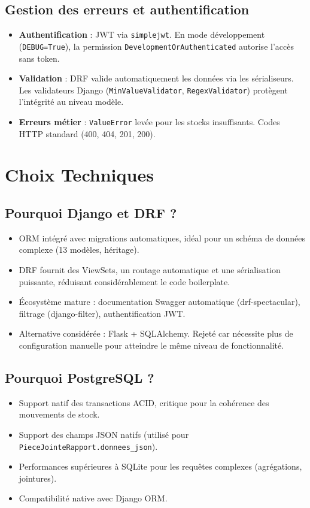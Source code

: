 \documentclass[12pt,a4paper]{report}
\begin{document}
\section{Gestion des erreurs et authentification}
\begin{itemize}
    \item \textbf{Authentification} : JWT via \texttt{simplejwt}. En mode développement (\texttt{DEBUG=True}), la permission \texttt{DevelopmentOrAuthenticated} autorise l'accès sans token.
    \item \textbf{Validation} : DRF valide automatiquement les données via les sérialiseurs. Les validateurs Django (\texttt{MinValueValidator}, \texttt{RegexValidator}) protègent l'intégrité au niveau modèle.
    \item \textbf{Erreurs métier} : \texttt{ValueError} levée pour les stocks insuffisants. Codes HTTP standard (400, 404, 201, 200).
\end{itemize}

\chapter{Choix Techniques}

\section{Pourquoi Django et DRF ?}
\begin{itemize}
    \item ORM intégré avec migrations automatiques, idéal pour un schéma de données complexe (13 modèles, héritage).
    \item DRF fournit des ViewSets, un routage automatique et une sérialisation puissante, réduisant considérablement le code boilerplate.
    \item Écosystème mature : documentation Swagger automatique (drf-spectacular), filtrage (django-filter), authentification JWT.
    \item Alternative considérée : Flask + SQLAlchemy. Rejeté car nécessite plus de configuration manuelle pour atteindre le même niveau de fonctionnalité.
\end{itemize}

\section{Pourquoi PostgreSQL ?}
\begin{itemize}
    \item Support natif des transactions ACID, critique pour la cohérence des mouvements de stock.
    \item Support des champs JSON natifs (utilisé pour \texttt{PieceJointeRapport.donnees\_json}).
    \item Performances supérieures à SQLite pour les requêtes complexes (agrégations, jointures).
    \item Compatibilité native avec Django ORM.
\end{itemize}
\end{document}
